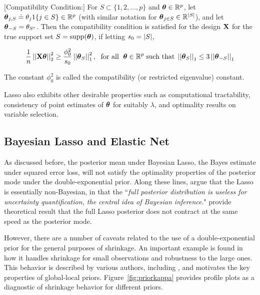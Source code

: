 \documentclass[sts,preprint]{imsart}
\begin{document}
\begin{definition}\label{def:compatibility}[Compatibility Condition:] 
For $S \subset \{1,2,\ldots,p\}$ and $\boldsymbol{\theta} \in \mathbb{R}^{p}$, let $\boldsymbol{\theta}_{j,S} \doteq \theta_j 1\{j \in S\} \in \mathbb{R}^{p}$ (with similar notation for $\boldsymbol{\theta}_{j \in S} \in \mathbb{R}^{\lvert S\rvert}$), and let $\boldsymbol{\theta}_{-S} = \theta_{S^c}$. Then the compatibility condition is satisfied for the design ${\bf X}$ for the true support set $S = \text{supp}(\boldsymbol{\theta})$, if letting $s_0 = \lvert S\rvert$,

\[
\frac{1}{n} \left|\left|{\bf X}\boldsymbol{\theta}\right|\right|_2^2 \ge \frac{\phi_0^2}{s_0} \left|\left|\boldsymbol{\theta}_{S}\right|\right|_1^2, \; \text{ for all } \; \boldsymbol{\theta} \in \mathbb{R}^p \; \text{such that} \; \left|\left|\boldsymbol{\theta}_S\right|\right|_1 \le 3 \left|\left|\boldsymbol{\theta}_{-S}\right|\right|_1
\]

The constant $\phi_0^2$ is called the compatibility (or restricted eigenvalue) constant.
\end{definition}

Lasso also exhibits other desirable properties such as computational tractability, consistency of point estimates of $\boldsymbol{\theta}$ for suitably $\lambda$, and optimality results on variable selection. 


\subsection{Bayesian Lasso and Elastic Net}

{As discussed before, the posterior mean under Bayesian Lasso, the Bayes estimate under squared error loss, will not satisfy the optimality properties of the posterior mode under the double-exponential prior}. Along these lines, \citet{castillo2015bayesian} argue that the Lasso is essentially non-Bayesian, in that the ``\textsl{full posterior distribution is useless for uncertainty quantification, the central idea of Bayesian inference}." \citet{castillo2015bayesian} provide theoretical result that the full Lasso posterior does not contract at the same speed as the posterior mode. 

However, there are a number of caveats related to the use of a double-exponential prior for the general purposes of shrinkage.  An important example is found in how it handles shrinkage for small observations and
robustness to the large ones.  This behavior is described by various authors, including \cite{polson2010shrink,datta2013asymptotic}, and motivates the key properties of global-local priors. Figure~\ref{fig:priorkappa} provides profile plots as a diagnostic of shrinkage behavior for different priors.
\end{document}
